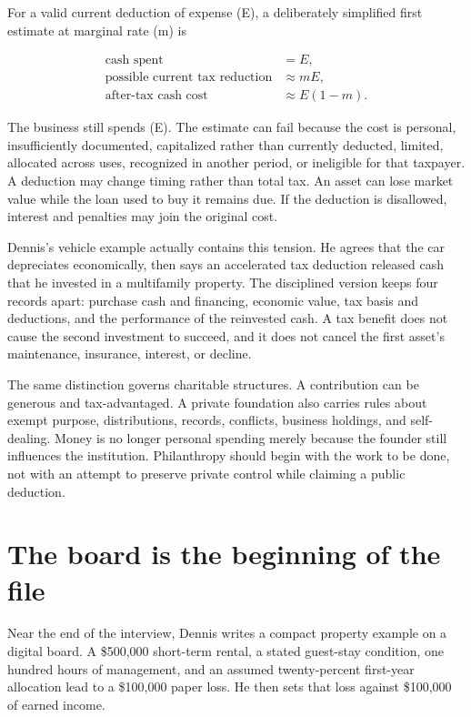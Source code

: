 For a valid current deduction of expense (E), a deliberately simplified
first estimate at marginal rate (m) is

\begin{equation}
\begin{aligned}
\text{cash spent}&=E,\\
\text{possible current tax reduction}&\approx mE,\\
\text{after-tax cash cost}&\approx E(1-m).
\end{aligned}
\end{equation}

The business still spends (E). The estimate can fail because the cost is
personal, insufficiently documented, capitalized rather than currently
deducted, limited, allocated across uses, recognized in another period, or
ineligible for that taxpayer. A deduction may change timing rather than total
tax. An asset can lose market value while the loan used to buy it remains due.
If the deduction is disallowed, interest and penalties may join the original
cost.

Dennis's vehicle example actually contains this tension. He agrees that the
car depreciates economically, then says an accelerated tax deduction released
cash that he invested in a multifamily property. The disciplined version keeps
four records apart: purchase cash and financing, economic value, tax basis and
deductions, and the performance of the reinvested cash. A tax benefit does not
cause the second investment to succeed, and it does not cancel the first
asset's maintenance, insurance, interest, or decline.

The same distinction governs charitable structures. A contribution can be
generous and tax-advantaged. A private foundation also carries rules about
exempt purpose, distributions, records, conflicts, business holdings, and
self-dealing. Money is no longer personal spending merely because the founder
still influences the institution. Philanthropy should begin with the work to
be done, not with an attempt to preserve private control while claiming a
public deduction.

\section{The board is the beginning of the file}

Near the end of the interview, Dennis writes a compact property example on a
digital board. A \$500,000 short-term rental, a stated guest-stay condition,
one hundred hours of management, and an assumed twenty-percent first-year
allocation lead to a \$100,000 paper loss. He then sets that loss against
\$100,000 of earned income.

